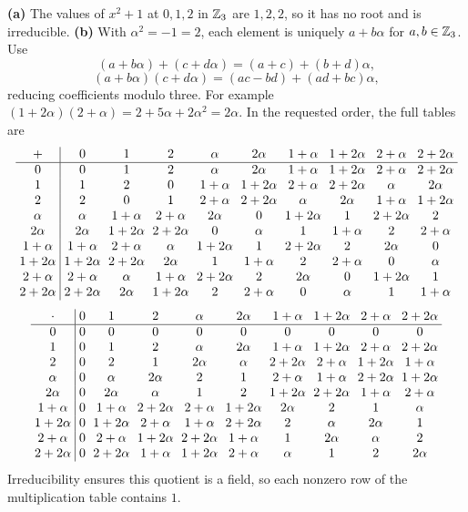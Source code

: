 \textbf{(a)} The values of $x^2+1$ at $0,1,2$ in $\mathbb{Z}_3$ are $1,2,2$, so it has no root and is irreducible.
\textbf{(b)} With $\alpha^2=-1=2$, each element is uniquely $a+b\alpha$ for $a,b\in\mathbb{Z}_3$. Use
\[(a+b\alpha)+(c+d\alpha)=(a+c)+(b+d)\alpha,\]
\[(a+b\alpha)(c+d\alpha)=(ac-bd)+(ad+bc)\alpha,\]
reducing coefficients modulo three. For example $(1+2\alpha)(2+\alpha)=2+5\alpha+2\alpha^2=2\alpha$. In the requested order, the full tables are
\[
{\setlength{\arraycolsep}{3pt}\begin{array}{c|ccccccccc}+&0&1&2&\alpha&2\alpha&1+\alpha&1+2\alpha&2+\alpha&2+2\alpha\\\hline0&0&1&2&\alpha&2\alpha&1+\alpha&1+2\alpha&2+\alpha&2+2\alpha\\
1&1&2&0&1+\alpha&1+2\alpha&2+\alpha&2+2\alpha&\alpha&2\alpha\\
2&2&0&1&2+\alpha&2+2\alpha&\alpha&2\alpha&1+\alpha&1+2\alpha\\
\alpha&\alpha&1+\alpha&2+\alpha&2\alpha&0&1+2\alpha&1&2+2\alpha&2\\
2\alpha&2\alpha&1+2\alpha&2+2\alpha&0&\alpha&1&1+\alpha&2&2+\alpha\\
1+\alpha&1+\alpha&2+\alpha&\alpha&1+2\alpha&1&2+2\alpha&2&2\alpha&0\\
1+2\alpha&1+2\alpha&2+2\alpha&2\alpha&1&1+\alpha&2&2+\alpha&0&\alpha\\
2+\alpha&2+\alpha&\alpha&1+\alpha&2+2\alpha&2&2\alpha&0&1+2\alpha&1\\
2+2\alpha&2+2\alpha&2\alpha&1+2\alpha&2&2+\alpha&0&\alpha&1&1+\alpha\\\end{array}}
\]
\[
{\setlength{\arraycolsep}{3pt}\begin{array}{c|ccccccccc}\cdot&0&1&2&\alpha&2\alpha&1+\alpha&1+2\alpha&2+\alpha&2+2\alpha\\\hline0&0&0&0&0&0&0&0&0&0\\
1&0&1&2&\alpha&2\alpha&1+\alpha&1+2\alpha&2+\alpha&2+2\alpha\\
2&0&2&1&2\alpha&\alpha&2+2\alpha&2+\alpha&1+2\alpha&1+\alpha\\
\alpha&0&\alpha&2\alpha&2&1&2+\alpha&1+\alpha&2+2\alpha&1+2\alpha\\
2\alpha&0&2\alpha&\alpha&1&2&1+2\alpha&2+2\alpha&1+\alpha&2+\alpha\\
1+\alpha&0&1+\alpha&2+2\alpha&2+\alpha&1+2\alpha&2\alpha&2&1&\alpha\\
1+2\alpha&0&1+2\alpha&2+\alpha&1+\alpha&2+2\alpha&2&\alpha&2\alpha&1\\
2+\alpha&0&2+\alpha&1+2\alpha&2+2\alpha&1+\alpha&1&2\alpha&\alpha&2\\
2+2\alpha&0&2+2\alpha&1+\alpha&1+2\alpha&2+\alpha&\alpha&1&2&2\alpha\\\end{array}}
\]
Irreducibility ensures this quotient is a field, so each nonzero row of the multiplication table contains $1$.

